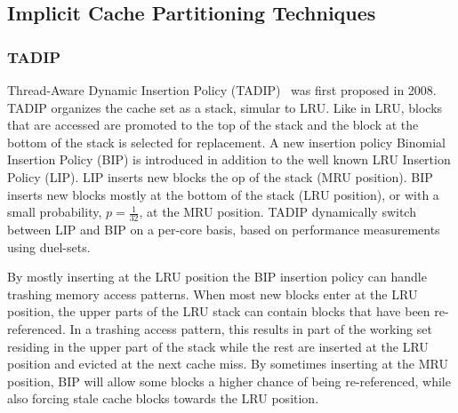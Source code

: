 




\subsection{Implicit Cache Partitioning Techniques}

\subsubsection{TADIP}
Thread-Aware Dynamic Insertion Policy (TADIP)~\cite{jaleel08} was first proposed in 2008.
TADIP organizes the cache set as a stack, simular to LRU.
Like in LRU, blocks that are accessed are promoted to the top of the stack and the block at the bottom of the stack is selected for replacement.
A new insertion policy Binomial Insertion Policy (BIP) is introduced in addition to the well known LRU Insertion Policy (LIP).
LIP inserts new blocks the op of the stack (MRU position).
BIP inserts new blocks mostly at the bottom of the stack (LRU position), or with a small probability, $p = \frac{1}{32}$, at the MRU position.
TADIP dynamically switch between LIP and BIP on a per-core basis, based on performance measurements using duel-sets.

By mostly inserting at the LRU position the BIP insertion policy can handle trashing memory access patterns.
When most new blocks enter at the LRU position, the upper parts of the LRU stack can contain blocks that have been re-referenced.
In a trashing access pattern, this results in part of the working set residing in the upper part of the stack while the rest are inserted at the LRU position and evicted at the next cache miss.
By sometimes inserting at the MRU position, BIP will allow some blocks a higher chance of being re-referenced, while also forcing stale cache blocks towards the LRU position. 

